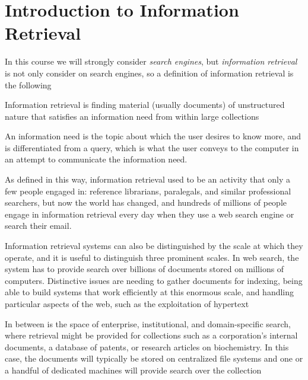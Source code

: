 \chapter{Introduction to Information Retrieval}
In this course we will strongly consider \emph{search engines}, but \emph{information retrieval} is not
only consider on search engines, so a definition of information retrieval is the following

\begin{defi}
Information retrieval is finding material (usually documents) of unstructured nature that satisfies
an information need from within large collections
\end{defi}
An information need is the topic about which the user desires to know more, and is differentiated from a query,
which is what the user conveys to the computer in an attempt to communicate the information need.

As defined in this way, information retrieval used to be an activity that only a few people engaged in:
reference librarians, paralegals, and similar professional searchers, but now the world has changed,
and hundreds of millions of people engage in information retrieval every day when 
they use a web search engine or search their email.

Information retrieval systems can also be distinguished by the scale at
which they operate, and it is useful to distinguish three prominent scales.
In web search, the system has to provide search over billions of documents
stored on millions of computers. Distinctive issues are needing to gather
documents for indexing, being able to build systems that work efficiently
at this enormous scale, and handling particular aspects of the web, such as
the exploitation of hypertext

In between is the space of enterprise,
institutional, and domain-specific search, where retrieval might be provided for
collections such as a corporation’s internal documents, a database of patents,
or research articles on biochemistry. In this case, the documents will typically be stored on
centralized file systems and one or a handful of dedicated
machines will provide search over the collection

